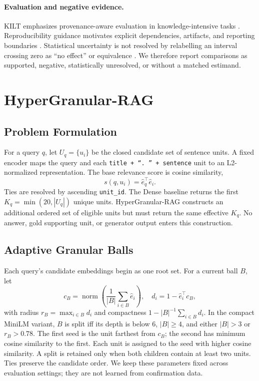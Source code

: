 \documentclass[11pt]{article}
\newcommand{\hgrag}{HyperGranular-RAG\xspace}
\begin{document}
\paragraph{Evaluation and negative evidence.}
KILT emphasizes provenance-aware evaluation in knowledge-intensive tasks
\citep{petroni2021kilt}. Reproducibility guidance motivates explicit
dependencies, artifacts, and reporting boundaries
\citep{pineau2021reproducibility}. Statistical uncertainty is not resolved by
relabelling an interval crossing zero as ``no effect'' or equivalence
\citep{amrhein2019retire}. We therefore report comparisons as supported,
negative, statistically unresolved, or without a matched estimand.

\section{HyperGranular-RAG}

\subsection{Problem Formulation}

For a query $q$, let $U_q=\{u_i\}$ be the closed candidate set of sentence
units. A fixed encoder maps the query and each
\texttt{title + ``. '' + sentence} unit to an L2-normalized representation. The base
relevance score is cosine similarity,
\begin{equation}
s(q,u_i)=\hat e_q^\top \hat e_i.
\end{equation}
Ties are resolved by ascending \texttt{unit\_id}. The Dense baseline returns
the first $K_q=\min(20,|U_q|)$ unique units. \hgrag constructs an additional
ordered set of eligible units but must return the same effective $K_q$. No
answer, gold supporting unit, or generator output enters this construction.

\subsection{Adaptive Granular Balls}

Each query's candidate embeddings begin as one root set. For a current ball
$B$, let
\begin{equation}
 c_B=\operatorname{norm}\left(\frac{1}{|B|}\sum_{i\in B}\hat e_i\right),\quad
 d_i=1-\hat e_i^\top c_B,
\end{equation}
with radius $r_B=\max_{i\in B}d_i$ and compactness
$1-|B|^{-1}\sum_{i\in B}d_i$. In the compact MiniLM variant, $B$ is split iff
its depth is below 6, $|B|\geq4$, and either $|B|>3$ or $r_B>0.78$. The first
seed is the unit farthest from $c_B$; the second has minimum cosine similarity
to the first. Each unit is assigned to the seed with higher cosine similarity.
A split is retained only when both children contain at least two units.
Ties preserve the candidate order. We keep these parameters fixed across
evaluation settings; they are not learned from confirmation data.
\end{document}
